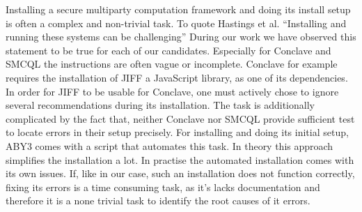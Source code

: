 Installing a secure multiparty computation framework and doing its install setup is often a complex and non-trivial task. To quote Hastings et al. ``Installing and running these systems can be challenging'' \cite{hastings2019sok} 
During our work we have observed this statement to be true for each of our candidates.
Especially for Conclave and SMCQL the instructions are often vague or incomplete. Conclave for example requires the installation of JIFF \cite{JIFF} a JavaScript library, as one of its dependencies. In order for JIFF to be usable for Conclave, one must actively chose to ignore several recommendations during its installation. The task is additionally complicated by the fact that, neither Conclave nor SMCQL provide sufficient test to locate errors in their setup precisely. For installing and doing its initial setup, ABY3 comes with a script that automates this task. In theory this approach simplifies the installation a lot. In practise the automated installation comes with its own issues. If, like in our case, such an installation does not function correctly, fixing its errors is a time consuming task, as it's lacks documentation and therefore it is a none trivial task to identify the root causes of it errors.


